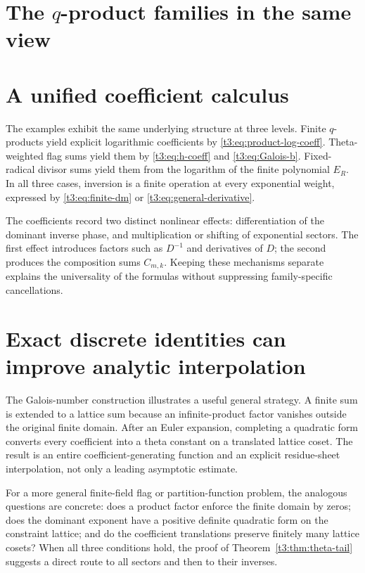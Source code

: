 \documentclass[11pt,openany]{book}
\numberwithin{equation}{chapter}
\theoremstyle{plain}
\theoremstyle{definition}
\theoremstyle{remark}
\begin{document}
\section{The $q$-product families in the same view}
\label{ct:sec:synthesis-t3}

\label{t3:sec:conclusion}

\section{A unified coefficient calculus}

The examples exhibit the same underlying structure at three levels. Finite $q$-products yield explicit logarithmic coefficients by \eqref{t3:eq:product-log-coeff}. Theta-weighted flag sums yield them by \eqref{t3:eq:h-coeff} and \eqref{t3:eq:Galois-b}. Fixed-radical divisor sums yield them from the logarithm of the finite polynomial $E_R$. In all three cases, inversion is a finite operation at every exponential weight, expressed by \eqref{t3:eq:finite-dm} or \eqref{t3:eq:general-derivative}.

The coefficients record two distinct nonlinear effects: differentiation of the dominant inverse phase, and multiplication or shifting of exponential sectors. The first effect introduces factors such as $D^{-1}$ and derivatives of $D$; the second produces the composition sums $C_{m,k}$. Keeping these mechanisms separate explains the universality of the formulas without suppressing family-specific cancellations.

\section{Exact discrete identities can improve analytic interpolation}

The Galois-number construction illustrates a useful general strategy. A finite sum is extended to a lattice sum because an infinite-product factor vanishes outside the original finite domain. After an Euler expansion, completing a quadratic form converts every coefficient into a theta constant on a translated lattice coset. The result is an entire coefficient-generating function and an explicit residue-sheet interpolation, not only a leading asymptotic estimate.

For a more general finite-field flag or partition-function problem, the analogous questions are concrete: does a product factor enforce the finite domain by zeros; does the dominant exponent have a positive definite quadratic form on the constraint lattice; and do the coefficient translations preserve finitely many lattice cosets? When all three conditions hold, the proof of Theorem~\ref{t3:thm:theta-tail} suggests a direct route to all sectors and then to their inverses.
\end{document}
